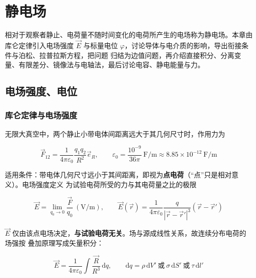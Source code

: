 
\chapter{静电场}

相对于观察者静止、电荷量不随时间变化的电荷所产生的电场称为静电场。本章由库仑定律引入电场强度
$\vec{E}$ 与标量电位 $\varphi$，讨论导体与电介质的影响，导出衔接条件与泊松、拉普拉斯方程，把问题
归结为边值问题，再介绍直接积分、分离变量、有限差分、镜像法与电轴法，最后讨论电容、静电能量与力。

\section{电场强度、电位}

\subsection{库仑定律与电场强度}

无限大真空中，两个静止小带电体间距离远大于其几何尺寸时，作用力为
\begin{formulaBox}
\[
\vec{F}_{12}=\frac{1}{4\pi\varepsilon_0}\frac{q_1q_2}{R^2}\vec{e}_R,
\qquad
\varepsilon_0=\frac{10^{-9}}{36\pi}\ \mathrm{F/m}\approx 8.85\times10^{-12}\ \mathrm{F/m}
\]
\end{formulaBox}

适用条件：带电体几何尺寸远小于其间距离，即视为\textbf{点电荷}（“点”只是相对意义）。电场强度定义
为试验电荷所受的力与其电荷量之比的极限
\begin{formulaBox}
\[
\vec{E}=\lim_{q_0\to0}\frac{\vec{F}}{q_0}\ (\mathrm{V/m}),
\qquad
\vec{E}(\vec{r})=\frac{1}{4\pi\varepsilon_0}\frac{q}{|\vec{r}-\vec{r}'|^3}\left(\vec{r}-\vec{r}'\right)
\]
\end{formulaBox}

$\vec{E}$ 仅由该点电场决定，\textbf{与试验电荷无关}。场与源成线性关系，故连续分布电荷的场强按
叠加原理写成矢量积分：
\begin{formulaBox}
\[
\vec{E}=\frac{1}{4\pi\varepsilon_0}\int\frac{\vec{R}}{R^3}\,\mathrm{d}q,
\qquad
\mathrm{d}q=\rho\,\mathrm{d}V'\ \text{或}\ \sigma\,\mathrm{d}S'\ \text{或}\ \tau\,\mathrm{d}l'
\]
\end{formulaBox}

